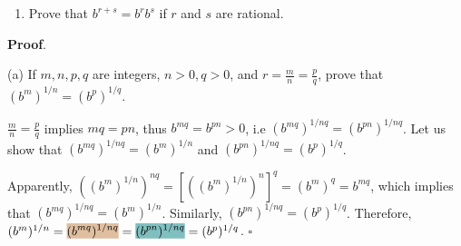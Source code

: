 \documentclass[10pt,varwidth=6in,margin=0.2in,preview]{standalone}
\newcommand{\highlightb}[1]{\setlength{\fboxsep}{0pt}\colorbox{brown!50}{$\displaystyle#1$}}
\newcommand{\highlightt}[1]{\setlength{\fboxsep}{0pt}\colorbox{teal!50}{$\displaystyle#1$}}
\begin{document}
\begin{flushleft}
\begin{enumerate}[label=(\alph*)]

\item
Prove that $b^{r+s} = b^r b^s$ if $r$ and $s$ are rational.

\end{enumerate}



\textbf{Proof}.

\vspace{0.1in}

(a) If $m, n, p, q$ are integers, $n > 0, q > 0$, and $r = \frac{m}{n} = \frac{p}{q}$, prove that $(b^m)^{1/n} = (b^p)^{1/q}$.


\vspace{0.1in}

$\frac{m}{n} = \frac{p}{q}$ implies $mq = pn$, thus $b^{mq} = b^{pn} > 0$, i.e $(b^{mq})^{1/nq} = (b^{pn})^{1/nq}$.
Let us show that $(b^{mq})^{1/nq} = (b^m)^{1/n}$ and $(b^{pn})^{1/nq} = (b^p)^{1/q}$.

Apparently, $\left( (b^m)^{1/n} \right)^{nq} = \left[ \left( (b^m)^{1/n} \right)^n \right]^q = (b^m)^q = b^{mq}$, which implies that $(b^{mq})^{1/nq} = (b^m)^{1/n}$.
Similarly, $(b^{pn})^{1/nq} = (b^p)^{1/q}$.
Therefore, $(b^m)^{1/n} = \highlightb{(b^{mq})^{1/nq}} = \highlightt{(b^{pn})^{1/nq}} = (b^p)^{1/q}$. $\square$


\end{flushleft}
\end{document}
